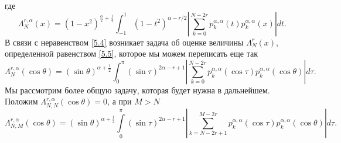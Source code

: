 где
\begin{equation}\label{5.5}
\Lambda^{r,\alpha}_N(x)=(1-x^2)^{\frac{\alpha}{2}+\frac14}  \int_{-1}^1(1-t^2)^{\alpha-r/2} \left|\sum_{k=0}^{N-2r}p_{k}^{\alpha,\alpha}(t)p_{k}^{\alpha,\alpha}(x)\right|dt.
\end{equation}
В связи с неравенством \eqref{5.4} возникает задача об оценке величины $\Lambda^r_N(x)$, определенной равенством \eqref{5.5}, которое мы можем переписать еще так
\begin{equation}\label{5.6}
\Lambda^{r,\alpha}_N(\cos\theta)=(\sin\theta)^{\alpha+\frac12}  \int_{0}^\pi(\sin\tau)^{2\alpha-r+1} \left|\sum_{k=0}^{N-2r}
p_{k}^{\alpha,\alpha}(\cos\tau)p_{k}^{\alpha,\alpha}(\cos\theta)\right|d\tau.
\end{equation}
Мы рассмотрим   более общую задачу, которая будет нужна в дальнейшем. Положим $\Lambda^{r,\alpha}_{N,N}(\cos\theta)=0$, а  при $M>N$
\begin{equation}\label{5.7}
\Lambda^{r,\alpha}_{N,M}(\cos\theta)=(\sin\theta)^{\alpha+\frac12}  \int\limits_{0}^\pi(\sin\tau)^{2\alpha-r+1} \left|\sum_{k=N-2r+1}^{M-2r}
p_{k}^{\alpha,\alpha}(\cos\tau)p_{k}^{\alpha,\alpha}(\cos\theta)\right|d\tau.
\end{equation}

